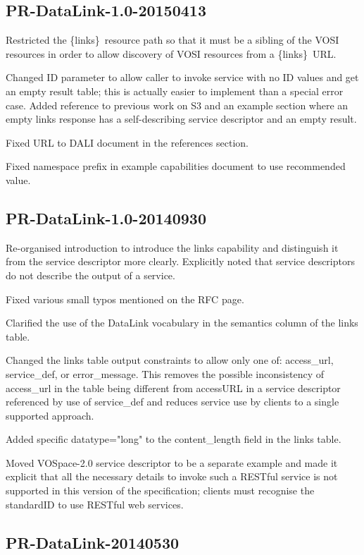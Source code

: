 \documentclass[11pt,a4paper]{ivoa}
\newcommand{\blinks}{\{links\}}
\begin{document}
\subsection{PR-DataLink-1.0-20150413}

Restricted the \blinks\ resource path so that it must be a sibling of
the VOSI resources in order to allow discovery of VOSI resources from
a \blinks\ URL.

Changed ID parameter to allow caller to invoke service with no ID values
and get an empty result table; this is actually easier to implement
than a special error case. Added reference to previous work on S3 and
an example section where an empty links response has a self-describing
service descriptor and an empty result.

Fixed URL to DALI document in the references section.

Fixed namespace prefix in example capabilities document to use recommended
value.


\subsection{PR-DataLink-1.0-20140930}

Re-organised introduction to introduce the links capability and
distinguish it from the service descriptor more clearly. Explicitly
noted that service descriptors do not describe the output of a service.

Fixed various small typos mentioned on the RFC page.

Clarified the use of the DataLink vocabulary in the semantics column of
the links table.

Changed the links table output constraints to allow only one of:
access\_url, service\_def, or error\_message. This removes the possible
inconsistency of access\_url in the table being different from accessURL
in a service descriptor referenced by use of service\_def and reduces
service use by clients to a single supported approach.

Added specific datatype="long" to the content\_length field in the
links table.

Moved VOSpace-2.0 service descriptor to be a separate example and made
it explicit that all the necessary details to invoke such a RESTful
service is not supported in this version of the specification; clients
must recognise the standardID to use RESTful web services.


\subsection{PR-DataLink-20140530}
\end{document}
